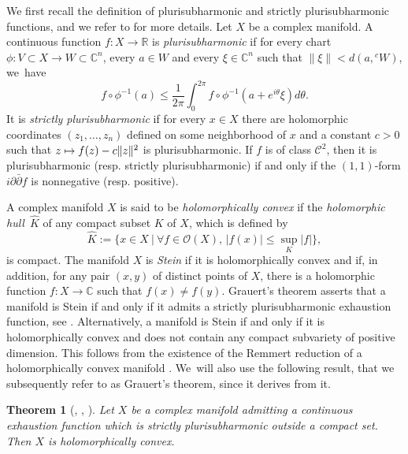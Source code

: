 \documentclass[11pt]{article}
\newcommand{\resp}{resp.\xspace}
\let\ts\textstyle
\newcommand\mto{\mathchoice{\longmapsto}{\mapsto}{\mapsto}{\mapsto}}
\newtheorem*{theorem*}{Theorem}
\theoremstyle{definition}
\newcommand{\C}{\mathbb{C}}
\newcommand{\R}{\mathbb{R}}
\def\C{\mathbb{C}}
\begin{document}
We first recall the definition of plurisubharmonic and strictly plurisubharmonic functions, and we refer to \cite[Ch.\,1]{demaillyComplexAnalyticDifferential-manuel} for more details. Let $X$ be a complex manifold. A continuous function $f:X\to \R$ is \textit{plurisubharmonic} if for every chart $\phi:V\subset X\to W\subset \C^{n}$, every $a\in W$ and every $\xi\in \C^{n}$ such that $\lVert \xi\rVert < d(a,{}^{c}W)$, we~have
\begin{equation*}
f\circ\phi^{-1}(a) \le \frac{1}{2\pi}\int_{0}^{2\pi}f\circ\phi^{-1}(a+e^{i\theta}\xi)d\theta.
\end{equation*}
It is \textit{strictly plurisubharmonic} if for every $x\in X$ there are holomorphic coordinates $(z_1,\dots,z_n)$ defined on some neighborhood of $x$ and a constant $c>0$ such that $z\mto f(z)-c\lVert z\rVert^{2}$ is plurisubharmonic. If $f$ is of class $\mathcal{C}^2$, then it is plurisubharmonic (\resp strictly plurisubharmonic) if and only if the $(1,1)$-form $i\partial\bar\partial f$ is nonnegative (\resp positive).

A complex manifold $X$ is said to be \textit{holomorphically convex} if the \textit{holomorphic hull}~$\widehat{K}$ of any compact subset $K$ of $X$, which is defined by
\begin{equation*}
\widehat{K}:= \ts\{x\in X \ \vert\ \forall f\in \mathcal{O}(X),\, \lvert f(x)\rvert \le \sup_{K}\lvert f\rvert\},
\end{equation*}
is compact. The manifold $X$ is \textit{Stein} if it is holomorphically convex and if, in addition, for any pair $(x,y)$ of distinct points of $X$, there is a holomorphic function $f:X\to \C$ such that $f(x)\ne f(y)$. Grauert's theorem asserts that a manifold is Stein if and only if it admits a strictly plurisubharmonic exhaustion function, see \cite{grauertLeviProblemImbedding1958}. Alternatively, a manifold is Stein if and only if it is holomorphically convex and does not contain any compact subvariety of positive dimension. This follows from the existence of the Remmert reduction of a holomorphically convex manifold \cite[Th.\,2.1]{peternellPseudoconvexityLeviProblem1994}. We~will also use the following result, that we subsequently refer to as Grauert's theorem, since it derives from it.

\begin{theorem*}[{\cite{grauertLeviProblemImbedding1958}, \cite[Cor.\,2.4]{peternellPseudoconvexityLeviProblem1994}}, \cite{narasimhanLeviProblemComplex1962}]
Let $X$ be a complex manifold admitting a continuous exhaustion function which is strictly plurisubharmonic outside a compact set. Then $X$ is holomorphically convex.
\end{theorem*}
\end{document}
